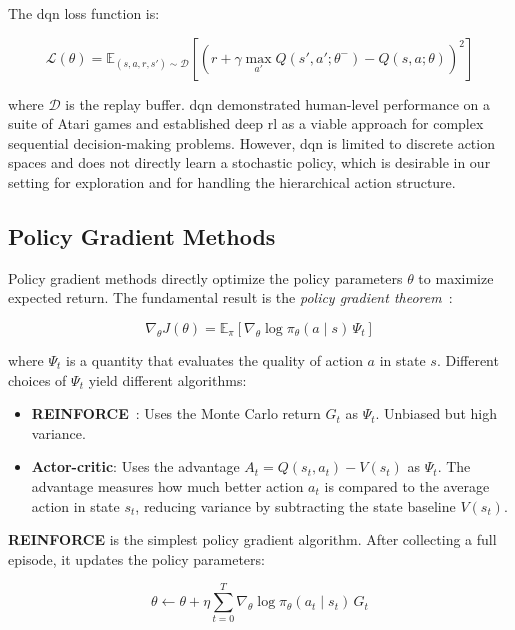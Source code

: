 The \gls{dqn} loss function is:

\begin{equation}
    \mathcal{L}(\theta) = \mathbb{E}_{(s, a, r, s') \sim \mathcal{D}}\left[ \left( r + \gamma \max_{a'} Q(s', a'; \theta^-) - Q(s, a; \theta) \right)^2 \right]
\end{equation}

where $\mathcal{D}$ is the replay buffer. \gls{dqn} demonstrated human-level performance on a suite of Atari games and established deep \gls{rl} as a viable approach for complex sequential decision-making problems. However, \gls{dqn} is limited to discrete action spaces and does not directly learn a stochastic policy, which is desirable in our setting for exploration and for handling the hierarchical action structure.

\subsection{Policy Gradient Methods}

Policy gradient methods directly optimize the policy parameters $\theta$ to maximize expected return. The fundamental result is the \textit{policy gradient theorem}~\cite{sutton1999policy}:

\begin{equation}
    \nabla_\theta J(\theta) = \mathbb{E}_\pi \left[ \nabla_\theta \log \pi_\theta(a \mid s) \, \Psi_t \right]
\end{equation}

where $\Psi_t$ is a quantity that evaluates the quality of action $a$ in state $s$. Different choices of $\Psi_t$ yield different algorithms:

\begin{itemize}
    \item \textbf{REINFORCE}~\cite{williams1992simple}: Uses the Monte Carlo return $G_t$ as $\Psi_t$. Unbiased but high variance.
    \item \textbf{Actor-critic}: Uses the advantage $A_t = Q(s_t, a_t) - V(s_t)$ as $\Psi_t$. The advantage measures how much better action $a_t$ is compared to the average action in state $s_t$, reducing variance by subtracting the state baseline $V(s_t)$.
\end{itemize}

\textbf{REINFORCE} is the simplest policy gradient algorithm. After collecting a full episode, it updates the policy parameters:

\begin{equation}
    \theta \leftarrow \theta + \eta \sum_{t=0}^{T} \nabla_\theta \log \pi_\theta(a_t \mid s_t) \, G_t
\end{equation}

